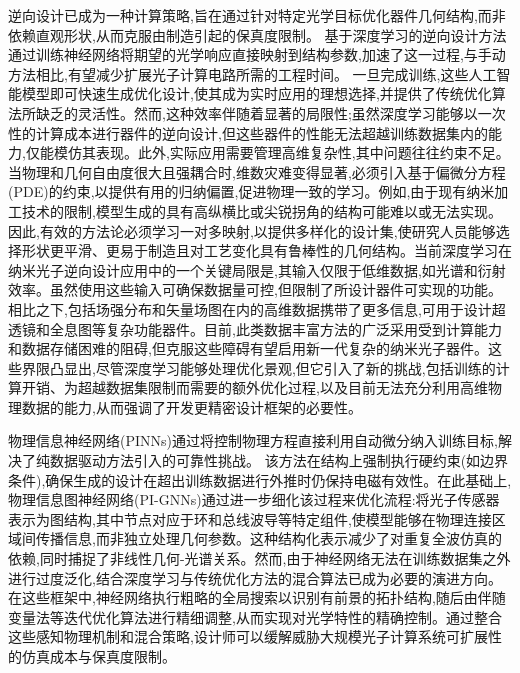 逆向设计已成为一种计算策略,旨在通过针对特定光学目标优化器件几何结构,而非依赖直观形状,从而克服由制造引起的保真度限制。\citep{doi_10_48550_arxiv_2506_21748_dc49c062} \citep{doi_10_1039_d4nr03081h_5c44e89e} 基于深度学习的逆向设计方法通过训练神经网络将期望的光学响应直接映射到结构参数,加速了这一过程,与手动方法相比,有望减少扩展光子计算电路所需的工程时间。\citep{doi_10_1117_12_3092203_3c6166cd} \citep{doi_10_1088_2040_8986_ae709e_8af9beda} 一旦完成训练,这些人工智能模型即可快速生成优化设计,使其成为实时应用的理想选择,并提供了传统优化算法所缺乏的灵活性。然而,这种效率伴随着显著的局限性;虽然深度学习能够以一次性的计算成本进行器件的逆向设计,但这些器件的性能无法超越训练数据集内的能力,仅能模仿其表现。此外,实际应用需要管理高维复杂性,其中问题往往约束不足。当物理和几何自由度很大且强耦合时,维数灾难变得显著,必须引入基于偏微分方程(PDE)的约束,以提供有用的归纳偏置,促进物理一致的学习。例如,由于现有纳米加工技术的限制,模型生成的具有高纵横比或尖锐拐角的结构可能难以或无法实现。因此,有效的方法论必须学习一对多映射,以提供多样化的设计集,使研究人员能够选择形状更平滑、更易于制造且对工艺变化具有鲁棒性的几何结构。当前深度学习在纳米光子逆向设计应用中的一个关键局限是,其输入仅限于低维数据,如光谱和衍射效率。虽然使用这些输入可确保数据量可控,但限制了所设计器件可实现的功能。相比之下,包括场强分布和矢量场图在内的高维数据携带了更多信息,可用于设计超透镜和全息图等复杂功能器件。目前,此类数据丰富方法的广泛采用受到计算能力和数据存储困难的阻碍,但克服这些障碍有望启用新一代复杂的纳米光子器件。这些界限凸显出,尽管深度学习能够处理优化景观,但它引入了新的挑战,包括训练的计算开销、为超越数据集限制而需要的额外优化过程,以及目前无法充分利用高维物理数据的能力,从而强调了开发更精密设计框架的必要性。\citep{doi_10_1515_nanoph_2024_0536_4b6631ba} \citep{doi_10_29026_oes_2022_210012_27973a69} \citep{doi_10_1002_adom_202502062_d73a85e1} \citep{doi_10_1515_nanoph_2018_0183_d85e9193}

物理信息神经网络(PINNs)通过将控制物理方程直接利用自动微分纳入训练目标,解决了纯数据驱动方法引入的可靠性挑战。\citep{doi_10_1007_s10444_023_10065_9_12bf0652} 该方法在结构上强制执行硬约束(如边界条件),确保生成的设计在超出训练数据进行外推时仍保持电磁有效性。在此基础上,物理信息图神经网络(PI-GNNs)通过进一步细化该过程来优化流程:将光子传感器表示为图结构,其中节点对应于环和总线波导等特定组件,使模型能够在物理连接区域间传播信息,而非独立处理几何参数。这种结构化表示减少了对重复全波仿真的依赖,同时捕捉了非线性几何-光谱关系。然而,由于神经网络无法在训练数据集之外进行过度泛化,结合深度学习与传统优化方法的混合算法已成为必要的演进方向。在这些框架中,神经网络执行粗略的全局搜索以识别有前景的拓扑结构,随后由伴随变量法等迭代优化算法进行精细调整,从而实现对光学特性的精确控制。通过整合这些感知物理机制和混合策略,设计师可以缓解威胁大规模光子计算系统可扩展性的仿真成本与保真度限制。\citep{s2_cc39d5405a933620426d86298fa8fe4cd51915c5_27626ee3} \citep{doi_10_1109_pn70808_2026_11657775_11c9905d} \citep{doi_10_1021_acsphotonics_2c00968_06a2e96b}

